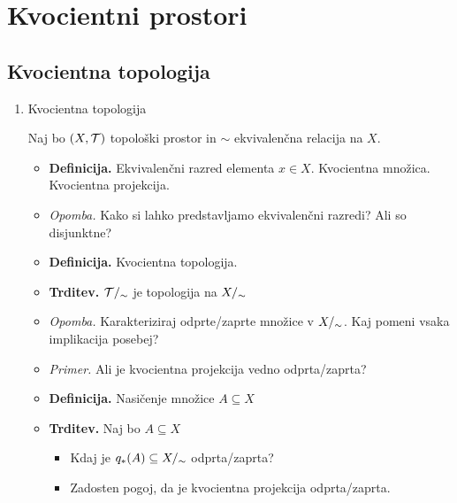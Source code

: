 \section{Kvocientni prostori}

\subsection{Kvocientna topologija}
\begin{enumerate}
    \item Kvocientna topologija
    
    Naj bo \((X, \mathcal{T})\) topološki prostor in \(\sim\) ekvivalenčna relacija na \(X\).
    \begin{itemize}
        \item \colorbox{purple!30}{\textbf{Definicija.}} Ekvivalenčni razred elementa \(x \in X\). Kvocientna množica. Kvocientna projekcija.
        \item \colorbox{yellow!30}{\emph{Opomba.}} Kako si lahko predstavljamo ekvivalenčni razredi? Ali so disjunktne?
        \item \colorbox{purple!30}{\textbf{Definicija.}} Kvocientna topologija.
        \item \colorbox{blue!30}{\textbf{Trditev.}} \(\mathcal{T}/_\sim\) je topologija na \({X/_\sim}\)
        \item \colorbox{yellow!30}{\emph{Opomba.}}  Karakteriziraj odprte/zaprte množice v \({X/_\sim}\). Kaj pomeni vsaka implikacija posebej?
        \item \colorbox{yellow!30}{\emph{Primer.}} Ali je kvocientna projekcija vedno odprta/zaprta?
        \item \colorbox{purple!30}{\textbf{Definicija.}} Nasičenje množice \(A \subseteq X\)
        \item \colorbox{blue!30}{\textbf{Trditev.}} Naj bo \(A \subseteq X\) 
        \begin{itemize}
            \item Kdaj je \(q_{*}(A) \subseteq {X/_\sim}\) odprta/zaprta?
            \item Zadosten pogoj, da je kvocientna projekcija odprta/zaprta.
        \end{itemize}
    \end{itemize}
\end{enumerate}

